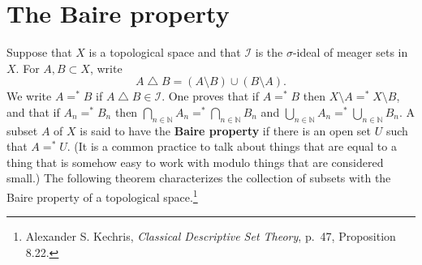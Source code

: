 \documentclass{article}
\theoremstyle{definition}
\begin{document}
\section{The Baire property}
Suppose that $X$ is a topological space and that $\mathscr{I}$ is the $\sigma$-ideal of meager sets in $X$. 
For $A,B \subset X$, write
\[
A \bigtriangleup B =(A \setminus B) \cup (B \setminus A).
\]
We write $A=^* B$ if $A \bigtriangleup B \in \mathscr{I}$.
One proves that if $A=^* B$ then $X \setminus A =^* X \setminus B$, and that if
$A_n=^* B_n$ then $\bigcap_{n \in \mathbb{N}} A_n =^* \bigcap_{n \in \mathbb{N}} B_n$ and
$\bigcup_{n \in \mathbb{N}} A_n =^* \bigcup_{n \in \mathbb{N}} B_n$.
A subset $A$ of $X$ is said to have the \textbf{Baire property} if
there is an open set $U$ such that $A=^* U$. (It is a common practice to talk about things that are equal to a thing that is somehow easy to work with
modulo things that are considered small.) The following theorem characterizes the collection of subsets with the Baire property of a topological space.\footnote{Alexander S. Kechris, {\em Classical Descriptive Set Theory}, p.~47, Proposition 8.22.}
\end{document}
